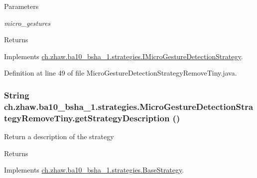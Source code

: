 \begin{DoxyParams}{Parameters}
\item[{\em micro\_\-gestures}]\end{DoxyParams}
\begin{DoxyReturn}{Returns}

\end{DoxyReturn}


Implements \hyperlink{interfacech_1_1zhaw_1_1ba10__bsha__1_1_1strategies_1_1IMicroGestureDetectionStrategy_a8593331fb67e5d4dc890d3db9f2d1b58}{ch.zhaw.ba10\_\-bsha\_\-1.strategies.IMicroGestureDetectionStrategy}.

Definition at line 49 of file MicroGestureDetectionStrategyRemoveTiny.java.\hypertarget{classch_1_1zhaw_1_1ba10__bsha__1_1_1strategies_1_1MicroGestureDetectionStrategyRemoveTiny_a4b884732838b849076ba7563111496d2}{
\subsubsection[{getStrategyDescription}]{\setlength{\rightskip}{0pt plus 5cm}String ch.zhaw.ba10\_\-bsha\_\-1.strategies.MicroGestureDetectionStrategyRemoveTiny.getStrategyDescription ()}}
\label{classch_1_1zhaw_1_1ba10__bsha__1_1_1strategies_1_1MicroGestureDetectionStrategyRemoveTiny_a4b884732838b849076ba7563111496d2}
Return a description of the strategy

\begin{DoxyReturn}{Returns}

\end{DoxyReturn}


Implements \hyperlink{classch_1_1zhaw_1_1ba10__bsha__1_1_1strategies_1_1BaseStrategy_a75fdb36932ad701f6375cc1fe718056b}{ch.zhaw.ba10\_\-bsha\_\-1.strategies.BaseStrategy}.

